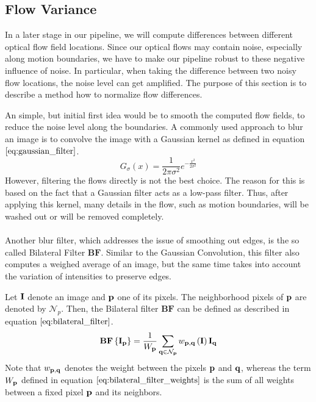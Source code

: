 \subsection{Flow Variance}
In a later stage in our pipeline, we will compute differences between different optical flow field locations. Since our optical flows may contain noise, especially along motion boundaries, we have to make our pipeline robust to these negative influence of noise. In particular, when taking the difference between two noisy flow locations, the noise level can get amplified. The purpose of this section is to describe a method how to normalize flow differences. 

An simple, but initial first idea would be to smooth the computed flow fields, to reduce the noise level along the boundaries. A commonly used approach to blur an image is to convolve the image with a Gaussian kernel as defined in equation $\ref{eq:gaussian_filter}$.
\begin{equation}
	G_{\sigma}\left( x \right) = \frac{1}{2 \pi \sigma^2} e^{-\frac{x^2}{2 \sigma^2}}
\label{eq:gaussian_filter}
\end{equation}
However, filtering the flows directly is not the best choice. The reason for this is based on the fact that a Gaussian filter acts as a low-pass filter. Thus, after applying this kernel, many details in the flow, such as motion boundaries, will be washed out or will be removed completely. \\ \\
Another blur filter, which addresses the issue of smoothing out edges, is the so called Bilateral Filter $\textbf{BF}$. Similar to the Gaussian Convolution, this filter also computes a weighed average of an image, but the same time takes into account the variation of intensities to preserve edges. 

Let $\bf{I}$ denote an image and $\bf{p}$ one of its pixels. The neighborhood pixels of $\bf{p}$ are denoted by $\mathcal{N}_p$. Then, the Bilateral filter $\textbf{BF}$ can be defined as described in equation $\ref{eq:bilateral_filter}$.
\begin{equation}
	\textbf{BF} \left\{ \bf{I}_{\bf{p}} \right\} = \frac{1}{W_{\bf{p}}} \sum_{\bf{q} \in \mathcal{N}_p} w_{\bf{p}, \bf{q}} \left( \bf{I} \right) \bf{I}_{\bf{q}}
\label{eq:bilateral_filter}
\end{equation}
Note that $w_{\bf{p}, \bf{q}}$ denotes the weight between the pixels $\bf{p}$ and $\bf{q}$, whereas the term $W_{\bf{p}}$ defined in equation $\ref{eq:bilateral_filter_weights}$ is the sum of all weights between a fixed pixel $\bf{p}$ and its neighbors.

